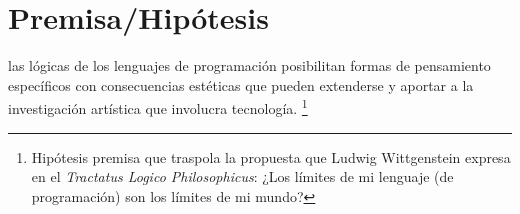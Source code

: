 \section*{Premisa/Hipótesis}

las lógicas de los lenguajes de programación posibilitan formas de pensamiento específicos con consecuencias estéticas que pueden extenderse y aportar a la investigación artística que involucra tecnología. \footnote{Hipótesis premisa que traspola la propuesta que Ludwig Wittgenstein expresa en el \textit{Tractatus Logico Philosophicus}: ¿Los límites de mi lenguaje (de programación) son los límites de mi mundo?}
